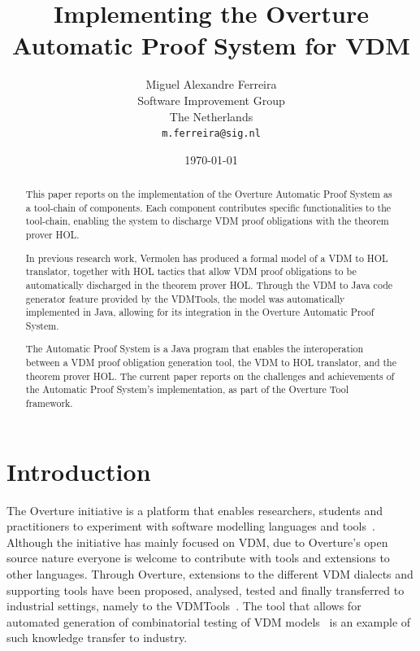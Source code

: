 \documentclass[]{article}
\title{Implementing the Overture Automatic Proof System for VDM}
\author{Miguel Alexandre Ferreira\\
        Software Improvement Group\\
		The Netherlands\\ 
		\texttt{m.ferreira@sig.nl}}
\date{\today}
\begin{document}
\maketitle
\begin{abstract}
This paper reports on the implementation of the Overture Automatic Proof System as a tool-chain of components.
Each component contributes specific functionalities to the tool-chain, enabling the system to discharge VDM proof obligations with the theorem prover HOL.

In previous research work, Vermolen has produced a formal model of a VDM to HOL translator, together with HOL tactics that allow VDM proof obligations to be automatically discharged in the theorem prover HOL.
Through the VDM to Java code generator feature provided by the VDMTools, the model was automatically implemented in Java, allowing for its integration in the Overture Automatic Proof System.

The Automatic Proof System is a Java program that enables the interoperation between a VDM proof obligation generation tool, the VDM to HOL translator, and the theorem prover HOL.
The current paper reports on the challenges and achievements of the Automatic Proof System's implementation, as part of the Overture Tool framework.
\end{abstract}

\section{Introduction}
\label{sec:introduction}

The Overture initiative is a platform that enables researchers, students and practitioners to experiment with software modelling languages and tools~\cite{LarsenBFL08}.
Although the initiative has mainly focused on VDM, due to Overture's open source nature everyone is welcome to contribute with tools and extensions to other languages.
Through Overture, extensions to the different VDM dialects and supporting tools have been proposed, analysed, tested and finally transferred to industrial settings, namely to the VDMTools~\cite{DBLP:journals/sigplan/FitzgeraldLS08}.
The tool that allows for automated generation of combinatorial testing of VDM models~\cite{Larsen&09a} is an example of such knowledge transfer to industry.
\end{document}
